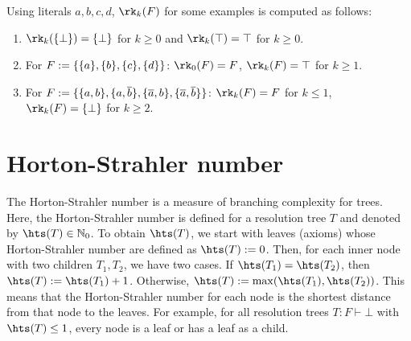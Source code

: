 \documentclass[]{book}
\begin{document}
\begin{examp}\label{exp:rk}
Using literals $a,b,c,d$, $\rk_k(F)$ for some examples is computed as follows:
  \begin{enumerate}
  \item $\rk_k(\set{\bot}) = \set{\bot}$ for $k \ge 0$ and $\rk_k(\top) = \top$ for $k \ge 0$.
  \item For $F := \{ \{ a \},\{ b \},\{ c \},\{ d \} \}$: $\rk_0(F) = F$, $\rk_k(F) = \top$ for $k \ge 1$.
  \item For $F := \{ \{ a,b \},\{ a,\overline{b} \}, \{ \overline{a},b \},\{ \overline{a},\overline{b} \} \}$: $\rk_k(F) = F$ for $k \le 1$, $\rk_k(F) = \set{\bot}$ for $k \ge 2$.
  \end{enumerate}
\end{examp}

\section{Horton-Strahler number}
\label{sec:hs}

The Horton-Strahler number is a measure of branching complexity for trees. Here, the Horton-Strahler number is defined for a resolution tree $T$ and denoted by $\hts(T) \in \NNZ$. To obtain $\hts(T)$, we start with leaves (axioms) whose Horton-Strahler number are defined as $\hts(T) := 0$. Then, for each inner node with two children $T_1, T_2$, we have two cases. If $\hts(T_1)= \hts(T_2)$, then $\hts(T) := \hts(T_1)+ 1$. Otherwise, $\hts(T) := \max(\hts(T_1),\hts(T_2))$. This means that the Horton-Strahler number for each node is the shortest distance from that node to the leaves. For example, for all resolution trees $T:F \vdash \bot$ with $\hts(T) \leq 1$, every node is a leaf or has a leaf as a child.


\end{document}
